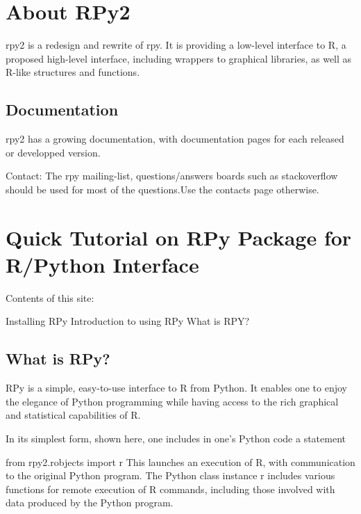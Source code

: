 \documentclass[a4paper,12pt]{article}
\begin{document}
\tableofcontents

\section{About RPy2}

rpy2 is a redesign and rewrite of rpy. It is providing a low-level interface to R, a proposed high-level interface, including wrappers to graphical libraries, as well as R-like structures and functions.

\subsection{Documentation}

rpy2 has a growing documentation, with documentation pages for each released or developped version.

Contact: The rpy mailing-list, questions/answers boards such as stackoverflow should be used for most of the questions.Use the contacts page otherwise.
\newpage

\section{Quick Tutorial on RPy Package for R/Python Interface}


Contents of this site:

Installing RPy
Introduction to using RPy
What is RPY?

\subsection{What is RPy?}
RPy is a simple, easy-to-use interface to R from Python. It enables one to enjoy the elegance of Python programming while having access to the rich graphical and statistical capabilities of R.

In its simplest form, shown here, one includes in one's Python code a statement

from rpy2.robjects import r
This launches an execution of R, with communication to the original Python program. The Python class instance r includes various functions for remote execution of R commands, including those involved with data produced by the Python program.
\end{document}
